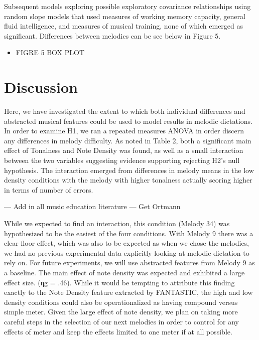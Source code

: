 \documentclass[]{book}
\providecommand{\tightlist}{%
  \setlength{\itemsep}{0pt}\setlength{\parskip}{0pt}}
\begin{document}
Subsequent models exploring possible exploratory covariance relationships using random slope models that used measures
of working memory capacity, general fluid intelligence, and measures of musical training, none of which emerged as significant.
Differences between melodies can be see below in Figure 5.

\begin{itemize}
\tightlist
\item
  FIGRE 5 BOX PLOT
\end{itemize}

\hypertarget{discussion-1}{%
\section{Discussion}\label{discussion-1}}

Here, we have investigated the extent to which both individual differences and abstracted musical features could be used to model results in melodic dictations.
In order to examine H1, we ran a repeated measures ANOVA in order discern any differences in melody difficulty.
As noted in Table 2, both a significant main effect of Tonalness and Note Density was found, as well as a small interaction between the two variables suggesting evidence supporting rejecting H2's
null hypothesis.
The interaction emerged from differences in melody means in the low density conditions with the melody with higher tonalness actually scoring higher in terms of number of errors.

--- Add in all music education literature
--- Get Ortmann

While we expected to find an interaction, this condition (Melody 34) was hypothesized to be the easiest of the four
conditions.
With Melody 9 there was a clear floor effect, which was also to be expected as when we chose the melodies, we had no previous experimental data explicitly looking at melodic dictation to rely on.
For future experiments, we will use abstracted features from Melody 9 as
a baseline.
The main effect of note density was expected and exhibited a large effect size. (ηg = .46).
While it would be tempting to attribute this finding exactly to the Note Density feature extracted by FANTASTIC, the high and low density conditions could also be operationalized as having compound versus simple meter.
Given the large effect of note density, we plan on taking more careful steps in the selection of our next melodies in order to control for any effects of meter and keep the effects limited to one meter if at all possible.
\end{document}
